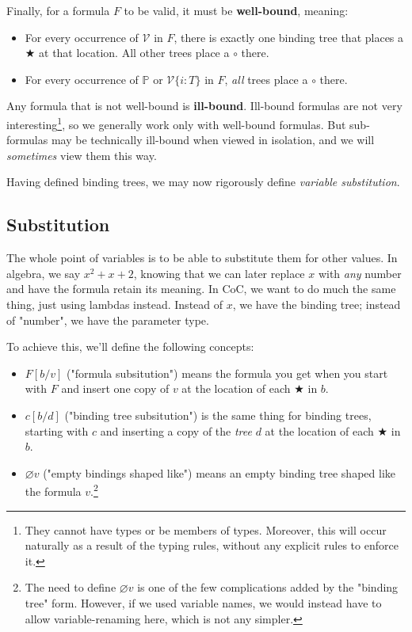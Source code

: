 \documentclass{article}
\newcommand{\Prop}{\mathbb{P}}
\newcommand{\usage}{\mathcal{V}}
\newcommand{\usageKnown}[2]{\usage\{#2:#1\}}
\newcommand{\subst}[3]{#1[{#2}{/}{#3}]}
\newcommand{\bindvariable}{\bigstar}
\newcommand{\bindnotthis}{\circ}
\newcommand{\emptybindingslike}[1]{\varnothing #1}
\begin{document}
  Finally, for a formula $F$ to be valid, it must be \textbf{well-bound}, meaning:
  \begin{itemize}
    \item For every occurrence of $\usage$ in $F$, there is exactly one binding tree that places a $\bindvariable$ at that location. All other trees place a $\bindnotthis$ there.
    \item For every occurrence of $\Prop$ or $\usageKnown{T}{i}$ in $F$, \emph{all} trees place a $\bindnotthis$ there.
  \end{itemize}
  
  Any formula that is not well-bound is \textbf{ill-bound}. Ill-bound formulas are not very interesting\footnote{They cannot have types or be members of types. Moreover, this will occur naturally as a result of the typing rules, without any explicit rules to enforce it.}, so we generally work only with well-bound formulas. But sub-formulas may be technically ill-bound when viewed in isolation, and we will \emph{sometimes} view them this way.
  
  Having defined binding trees, we may now rigorously define \emph{variable substitution}.
  
  
  
  \subsection{Substitution}
  
  The whole point of variables is to be able to substitute them for other values. In algebra, we say $x^2 + x + 2$, knowing that we can later replace $x$ with \emph{any} number and have the formula retain its meaning. In CoC, we want to do much the same thing, just using lambdas instead. Instead of $x$, we have the binding tree; instead of "number", we have the parameter type.
  
  To achieve this, we'll define the following concepts:
  
  \begin{itemize}
  \item $\subst{F}{b}{v}$ ("formula subsitution") means the formula you get when you start with $F$ and insert one copy of $v$ at the location of each $\bindvariable$ in $b$.
  \item $\subst{c}{b}{d}$ ("binding tree subsitution") is the same thing for binding trees, starting with $c$ and inserting a copy of the \emph{tree} $d$ at the location of each $\bindvariable$ in $b$.
  \item $\emptybindingslike{v}$ ("empty bindings shaped like") means an empty binding tree shaped like the formula $v$.\footnote{The need to define $\emptybindingslike{v}$ is one of the few complications added by the "binding tree" form. However, if we used variable names, we would instead have to allow variable-renaming here, which is not any simpler.}
  \end{itemize}
  
\end{document}
